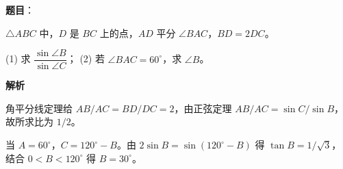 \begin{answer}

\textbf{题目}：

$\triangle ABC$ 中，$D$ 是 $BC$ 上的点，$AD$ 平分 $\angle BAC$，$BD=2DC$。

(1) 求 $\dfrac{\sin\angle B}{\sin\angle C}$；  
(2) 若 $\angle BAC=60^\circ$，求 $\angle B$。

\textbf{解析}


角平分线定理给 $AB/AC=BD/DC=2$，由正弦定理 $AB/AC=\sin C/\sin B$，故所求比为 $1/2$。


当 $A=60^\circ$，$C=120^\circ-B$。由 $2\sin B=\sin(120^\circ-B)$ 得 $\tan B=1/\sqrt3$，结合 $0<B<120^\circ$ 得 $B=30^\circ$。



\end{answer}
